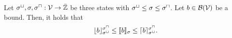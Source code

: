 \begin{theorem}
  Let ${\sigma^\sqcup}, \sigma, {\sigma^\sqcap}: \mathcal{V} \rightarrow \bar{\mathbb{Z}}$ be three states with ${\sigma^\sqcup} \leq \sigma \leq {\sigma^\sqcap}$.
  Let $b \in \mathcal{B}(\mathcal{V})$ be a bound.
  Then, it holds that
  \[ \lfloor b \rfloor^{{\sigma^\sqcap}}_{{\sigma^\sqcup}} \leq \llbracket b \rrbracket_{\sigma} \leq \lceil b \rceil^{{\sigma^\sqcap}}_{{\sigma^\sqcup}}. \]
\end{theorem}
